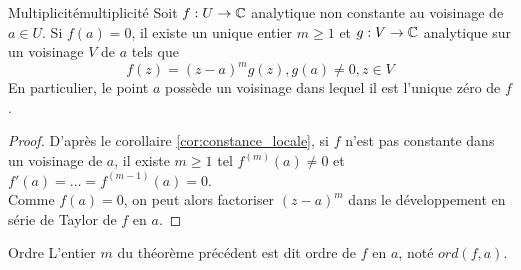 \documentclass{cours}
\begin{document}
\begin{théorème}{Multiplicité}{multiplicité}
    Soit $f : U \to \mathbb{C}$ analytique non constante au voisinage de $a \in U$. Si $f\left(a\right) = 0$, il existe un unique entier $m \geq 1$ et $g : V \to \mathbb{C}$ analytique sur un voisinage $V$ de $a$ tels que 
    \begin{equation*}
        f\left(z\right) = \left(z - a\right)^{m}g\left(z\right), g\left(a\right) \neq 0, z\in V
    \end{equation*}
    En particulier, le point $a$ possède un voisinage dans lequel il est l'unique zéro de $f$.
\end{théorème}
\begin{proof}
    D'après le corollaire \ref{cor:constance_locale}, si $f$ n'est pas constante dans un voisinage de $a$, il existe $m \geq 1$ tel $f^{\left(m\right)}\left(a\right) \neq 0$ et $f'\left(a\right) = \ldots = f^{\left(m-1\right)}\left(a\right) = 0$.\\
    Comme $f\left(a\right) = 0$, on peut alors factoriser $\left(z -a\right)^{m}$ dans le développement en série de Taylor de $f$ en $a$.
\end{proof}

\begin{définition}{Ordre}{}
    L'entier $m$ du théorème précédent est dit ordre de $f$ en $a$, noté $ord\left(f, a\right)$.
\end{définition}
\end{document}
